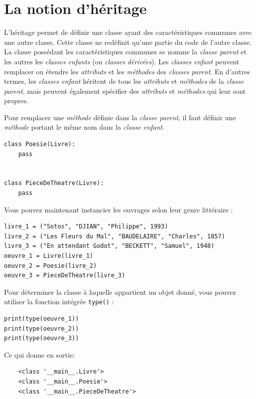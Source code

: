 \documentclass[a4paper,12pt]{book}
\begin{document}
\chapter{La notion d'héritage}
L'héritage permet de définir une classe ayant des caractéristiques communes avec une autre classe. Cette classe ne redéfinit qu'une partie du code de l'autre classe. La classe possédant les caractéristiques communes se nomme la \textit{classe parent} et les autres les \textit{classes enfants} (ou \textit{classes dérivées}). Les \textit{classes enfant} peuvent remplacer ou étendre les \textit{attributs} et les \textit{méthodes} des \textit{classes parent}. En d'autres termes, les \textit{classes enfant} héritent de tous les \textit{attributs} et \textit{méthodes} de la  \textit{classe parent}, mais peuvent également spécifier des \textit{attributs} et \textit{méthodes} qui leur sont propres.
\medskip

Pour remplacer une \textit{méthode} définie dans la \textit{classe parent}, il faut définir une \textit{méthode} portant le même nom dans la \textit{classe enfant}.
\begin{lstlisting}[caption=Définir deux textit{classes enfant}]
class Poesie(Livre):
    pass


class PieceDeTheatre(Livre):
    pass
\end{lstlisting}
\medskip

Vous pouvez maintenant instancier les ouvrages selon leur genre littéraire :
\begin{lstlisting}[caption=Les instanciations]
livre_1 = ("Sotos", "DJIAN", "Philippe", 1993)
livre_2 = ("Les Fleurs du Mal", "BAUDELAIRE", "Charles", 1857)
livre_3 = ("En attendant Godot", "BECKETT", "Samuel", 1948)
oeuvre_1 = Livre(livre_1)
oeuvre_2 = Poesie(livre_2)
oeuvre_3 = PieceDeTheatre(livre_3)
\end{lstlisting}
\medskip

Pour déterminer la classe à laquelle appartient un objet donné, vous pouvez utiliser la fonction intégrée \texttt{type()} :
\begin{lstlisting}[caption=La fonction \texttt{type()}]
print(type(oeuvre_1))
print(type(oeuvre_2))
print(type(oeuvre_3))
\end{lstlisting}
\medskip

Ce qui donne en sortie:
\begin{verbatim}
    <class '__main__.Livre'>
    <class '__main__.Poesie'>
    <class '__main__.PieceDeTheatre'>
\end{verbatim}
\medskip	
\end{document}

